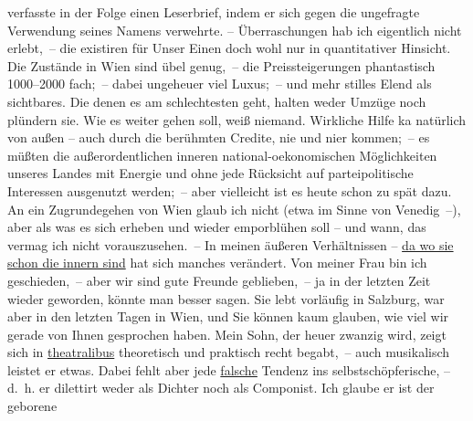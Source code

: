 \begin{ledgroupsized}[t]{13cm}
{{{                  verfasste in der Folge einen Leserbrief, indem er sich gegen die ungefragte
                  Verwendung seines Namens verwehrte.}}}\label{K_L02376_3h} – Überraschungen hab ich eigentlich
               nicht erlebt, – die existiren für Unser Einen doch wohl nur in quantitativer
               Hinsicht.\pend
           \pstart
           Die Zustände in Wien sind übel genug, – die
               Preissteigerungen phantastisch 1000–2000 fach; – dabei ungeheuer viel Luxus; – und
               mehr stilles Elend als sichtbares. Die denen es am schlechtesten geht, halten weder
               Umzüge noch plündern sie. Wie es weiter gehen soll, weiß niemand. Wirkliche {\pb}Hilfe ka{\geminationn} natürlich
               von außen – auch durch die berühmten Credite, nie und ni{\geminationm}er kommen; – es müßten die außerordentlichen inneren \introOben{}national-\introOben{}oekonomischen Möglichkeiten unseres Landes mit Energie und ohne
               jede Rücksicht auf \introOben{}partei\introOben{}politische  Interessen ausgenutzt werden; – aber vielleicht ist
               es heute schon zu spät dazu. An ein Zugrundegehen von Wien glaub ich nicht (etwa im Sinne von Venedig –), aber als was es sich erheben und wieder emporblühen soll – und
               wann, das vermag ich nicht vorauszusehen. –\pend
           \pstart
           In meinen äußeren Verhältnissen – \uline{da wo sie schon die
                  innern sind} hat sich manches verändert. Von meiner Frau bin ich geschieden, – aber wir sind gute
               Freunde geblieben, – ja in der letzten Zeit wieder geworden, könnte man besser sagen.
               Sie lebt vorläufig in Salzburg, war aber in den
               letzten Tagen in Wien, und Sie können kaum glauben,
               wie viel wir gerade von Ihnen gesprochen haben. Mein Sohn, der {\pb}heuer zwanzig
               wird, zeigt sich in \uline{theatralibus} theoretisch und
               praktisch recht begabt, – auch musikalisch leistet er etwas. Dabei fehlt aber jede
                  \uline{falsche} Tendenz ins selbstschöpferische, – d. h.
               er dilettirt weder als Dichter noch als Componist. Ich glaube er ist der geborene

\end{ledgroupsized}
